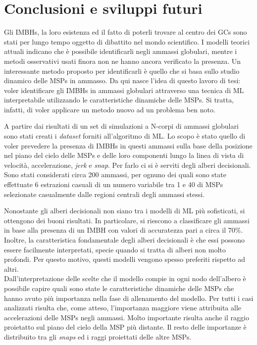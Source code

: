 \chapter{Conclusioni e sviluppi futuri}
\label{chap:cap5}
Gli IMBHs, la loro esistenza ed il fatto di poterli trovare al centro dei GCs sono stati per lungo tempo oggetto di dibattito nel mondo scientifico.
I modelli teorici attuali indicano che è possibile identificarli negli ammassi globulari, mentre i metodi osservativi usati finora non ne hanno ancora verificato la presenza. Un interessante metodo proposto per identificarli è quello che si basa sullo studio dinamico delle MSPs in ammasso. Da qui nasce l'idea di questo lavoro di tesi: voler identificare gli IMBHs in ammassi globulari attraverso una tecnica di ML interpretabile utilizzando le caratteristiche dinamiche delle MSPs. Si tratta, infatti, di voler applicare un metodo nuovo ad un problema ben noto.

A partire dai risultati di un set di simulazioni a N-corpi di ammassi globulari sono stati creati i \textit{dataset} forniti all'algoritmo di ML. Lo scopo è stato quello di voler prevedere la presenza di IMBHs in questi ammassi sulla base della posizione nel piano del cielo delle MSPs e delle loro componenti lungo la linea di vista di velocità, accelerazione, \textit{jerk} e \textit{snap}. Per farlo ci si è serviti degli alberi decisionali.\\
Sono stati considerati circa 200 ammassi, per ognuno dei quali sono state effettuate 6 estrazioni casuali di un numero variabile tra 1 e 40 di MSPs selezionate casualmente dalle regioni centrali degli ammassi stessi. 

Nonostante gli alberi decisionali non siano tra i modelli di ML più sofisticati, si ottengono dei buoni risultati. In particolare, si riescono a classificare gli ammassi in base alla presenza di un IMBH con valori di accuratezza pari a circa il $70\%$.\\ 
Inoltre, la caratteristica fondamentale degli alberi decisionali è che essi possono essere facilmente interpretati, specie quando si tratta di alberi non molto profondi. Per questo motivo, questi modelli vengono spesso preferiti rispetto ad altri.\\
Dall'interpretazione delle scelte che il modello compie in ogni nodo dell'albero è possibile capire quali sono state le caratteristiche dinamiche delle MSPs che hanno avuto più importanza nella fase di allenamento del modello. Per tutti i casi analizzati risulta che, come atteso, l'importanza maggiore viene attribuita alle accelerazioni delle MSPs negli ammassi. Molto importante risulta anche il raggio proietatto sul piano del cielo della MSP più distante. Il resto delle importanze è distribuito tra gli \textit{snaps} ed i raggi proiettati delle altre MSPs.

